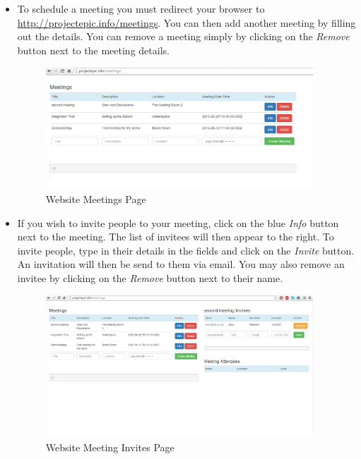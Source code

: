 \documentclass[a4paper,12pt,titlepage]{article}
\begin{document}
\begin{itemize}
        \item {To schedule a meeting you must redirect your browser to \url{http://projectepic.info/meetings}. You can then add another meeting by filling out the details. You can remove a meeting simply by clicking on the \textit{Remove} button next to the meeting details. 
        \begin{figure}[H]
                \centering
                \includegraphics[width=10cm]{webPics/meetings}
                \caption{Website Meetings Page}
                \label{fig}
            \end{figure}}
            
            \item {If you wish to invite people to your meeting, click on the blue \textit{Info} button next to the meeting. The list of invitees will then appear to the right. To invite people, type in their details in the fields and click on the \textit{Invite} button. An invitation will then be send to them via email. You may also remove an invitee by clicking on the \textit{Remove} button next to their name. 
          \begin{figure}[H]
                \centering
                \includegraphics[width=10cm]{webPics/meetinginfo}
                \caption{Website Meeting Invites Page}
                \label{fig}
            \end{figure}}          
            

    \end{itemize}
\end{document}
